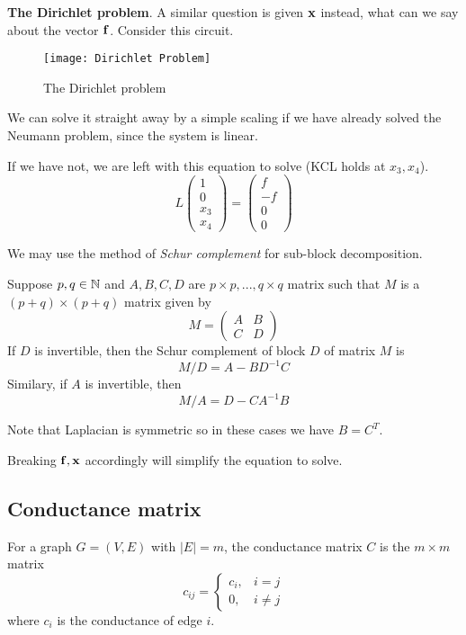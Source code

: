 \documentclass[11pt]{article}
\begin{document}
\vspace{5pt}\textbf{The Dirichlet problem}.
A similar question is given \(\bf{x}\) instead, what can we say about the vector \(\bf{f}\). Consider this circuit.

\begin{figure}[ht]
  \centering
  \texttt{[image: Dirichlet Problem]}
  \caption{The Dirichlet problem}
\end{figure} 

We can solve it straight away by a simple scaling if we have already solved the Neumann problem, since the system is linear. 

If we have not, we are left with this equation to solve (KCL holds at \(x_3,x_4\)).
\[L\begin{pmatrix}
  1\\0\\x_3\\x_4
\end{pmatrix}=\begin{pmatrix}
  f\\-f\\0\\0
\end{pmatrix}\]

We may use the method of \emph{Schur complement} for sub-block decomposition.
\begin{definition}
  Suppose \(p,q\in\N\) and \(A,B,C,D\) are \(p\times p, ..., q\times q\) matrix such that \(M\) is a \((p+q)\times(p+q)\) matrix given by
  \[M=\begin{pmatrix}
    A&B\\C&D
  \end{pmatrix}\]
  If \(D\) is invertible, then the Schur complement of block \(D\) of matrix \(M\) is 
  \[M/D=A-BD^{-1}C\]
  Similary, if \(A\) is invertible, then
  \[M/A=D-CA^{-1}B\]
\end{definition}
Note that Laplacian is symmetric so in these cases we have \(B=C^T\).

Breaking \(\bf{f},\bf{x}\) accordingly will simplify the equation to solve.

\subsection{Conductance matrix}

\begin{definition}
  For a graph \(G=(V,E)\) with \(|E|=m\), the conductance matrix \(C\) is the \(m\times m\) matrix
  \[c_{ij}=\begin{cases}
    c_i,& i=j\\
    0,& i\neq j
  \end{cases}\]
  where \(c_i\) is the conductance of edge \(i\).
\end{definition}
\end{document}
